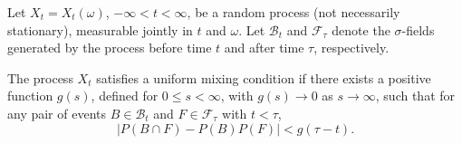 Let $X_t = X_t(\omega)$, $-\infty < t < \infty$, be a random process (not necessarily stationary), measurable jointly in $t$ and $\omega$. Let $\mathcal{B}_t$ and $\mathcal{F}_\tau$ denote the $\sigma$-fields generated by the process before time $t$ and after time $\tau$, respectively.

The process $X_t$ satisfies a uniform mixing condition if there exists a positive function $g(s)$, defined for $0 \leq s < \infty$, with $g(s) \to 0$ as $s \to \infty$, such that for any pair of events $B \in \mathcal{B}_t$ and $F \in \mathcal{F}_\tau$ with $t < \tau$,
$$|P(B \cap F) - P(B)P(F)| < g(\tau - t).$$

